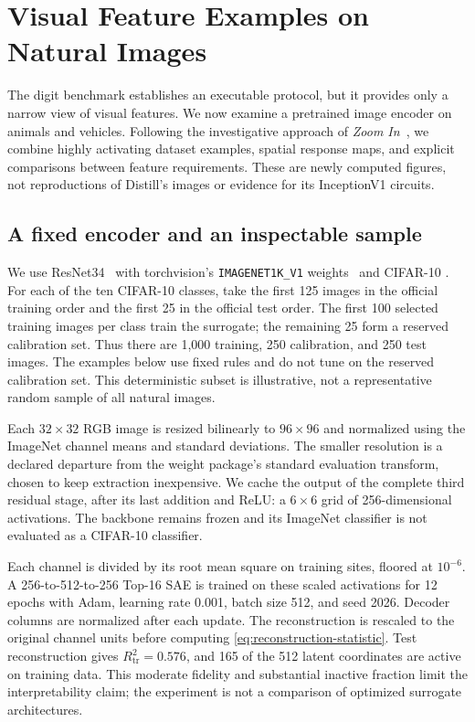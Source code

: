 \section{Visual Feature Examples on Natural Images}
\label{sec:visual-examples}
The digit benchmark establishes an executable protocol, but it provides
only a narrow view of visual features. We now examine a pretrained image
encoder on animals and vehicles. Following the investigative approach of
\emph{Zoom In}~\cite{olah2020zoom}, we combine highly activating dataset
examples, spatial response maps, and explicit comparisons between feature
requirements. These are newly computed figures, not reproductions of
Distill's images or evidence for its InceptionV1 circuits.

\subsection{A fixed encoder and an inspectable sample}
\label{sub:natural-protocol}
We use ResNet34~\cite{he2016resnet} with torchvision's
\texttt{IMAGENET1K\_V1} weights~\cite{torchvisionResnet34} and CIFAR-10
\cite{krizhevsky2009}. For each of the ten CIFAR-10 classes, take the
first 125 images in the official training order and the first 25 in the
official test order. The first 100 selected training images per class
train the surrogate; the remaining 25 form a reserved calibration set.
Thus there are 1,000 training, 250 calibration, and 250 test images.
The examples below use fixed rules and do not tune on the reserved
calibration set. This deterministic subset is illustrative, not a
representative random sample of all natural images.

Each $32\times32$ RGB image is resized bilinearly to $96\times96$ and
normalized using the ImageNet channel means and standard deviations.
The smaller resolution is a declared departure from the weight package's
standard evaluation transform, chosen to keep extraction inexpensive.
We cache the output of the complete third residual stage, after its
last addition and ReLU: a $6\times6$ grid of 256-dimensional activations.
The backbone remains frozen and its ImageNet classifier is not evaluated
as a CIFAR-10 classifier.

Each channel is divided by its root mean square on training sites,
floored at $10^{-6}$. A 256-to-512-to-256 Top-16 SAE is trained on these
scaled activations for 12 epochs with Adam, learning rate 0.001, batch
size 512, and seed 2026. Decoder columns are normalized after each update.
The reconstruction is rescaled to the original channel units before
computing \cref{eq:reconstruction-statistic}. Test reconstruction gives
$R^{2}_{\mathrm{tr}}=0.576$, and 165 of the 512 latent coordinates are
active on training data. This moderate fidelity and substantial inactive
fraction limit the interpretability claim; the experiment is not a
comparison of optimized surrogate architectures.

